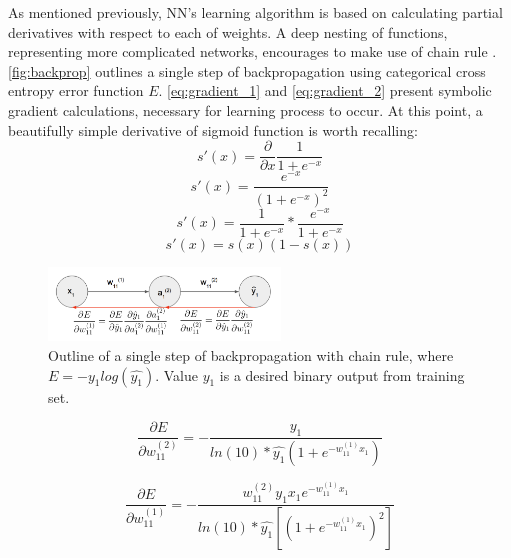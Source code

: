 \documentclass[11pt]{article}
\begin{document}
As mentioned previously, NN's learning algorithm is based on calculating partial derivatives with respect to each of weights. A deep nesting of functions, representing more complicated networks, encourages to make use of chain rule \cite{chain_rule_def}. \autoref{fig:backprop} outlines a single step of backpropagation using categorical cross entropy error function $E$. \autoref{eq:gradient_1} and \autoref{eq:gradient_2} present symbolic gradient calculations, necessary for learning process to occur. At this point, a beautifully simple derivative of sigmoid function is worth recalling:
\[ s'(x) = \frac{\partial}{\partial x}\frac{1}{1 + e^{-x}}\]
\[s'(x) = \frac{e^{-x}}{(1 + e^{-x})^2} \]
\[s'(x) = \frac{1}{1 + e^{-x}} * \frac{e^{-x}}{1 + e^{-x}}\]
\[ s'(x) = s(x)(1 - s(x))\]

\begin{figure}[h]
\includegraphics[width=0.55\textwidth]{backprop}
\centering
\caption{Outline of a single step of backpropagation with chain rule, where $E=-y_1log(\hat{y_1})$. Value $y_1$ is a desired binary output from training set.}
\label{fig:backprop}
\end{figure}

\begin{equation} \label{eq:gradient_1}
\frac{\partial E}{\partial w_{11}^{(2)}} = - \frac{y_1}{ln(10) * \hat{y_1}(1 + e^{-w_{11}^{(1)}x_1})}
\end{equation}

\begin{equation} \label{eq:gradient_2}
\frac{\partial E}{\partial w_{11}^{(1)}} = - \frac{w_{11}^{(2)}y_1x_1e^{-w_{11}^{(1)}x_1}}{ln(10) * \hat{y_1}[(1 + e^{-w_{11}^{(1)}x_1})^2]}
\end{equation}
\end{document}
